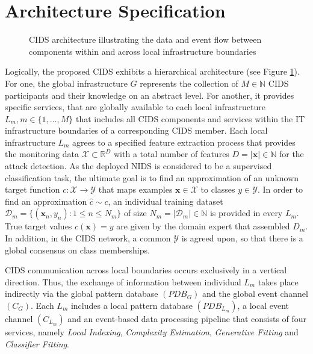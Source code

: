 \documentclass[../../main.tex]{subfiles}
\begin{document}
\section{Architecture Specification} \label{sec:architecture_specification}



\begin{figure}[b!]
    \centering
    
    \caption{CIDS architecture illustrating the data and event flow between components within and across local infrastructure boundaries}
    \label{fig:detailed_architecture}
    \end{figure}

    
    Logically, the proposed CIDS exhibits a hierarchical architecture (see Figure \ref{fig:detailed_architecture}). For one, the global infrastructure $G$ represents the collection of $M \in \mathbb{N}$ CIDS participants and their knowledge on an abstract level. For another, it provides specific services, that are globally available to each local infrastructure $L_m, m \in \{1, \dots, M\}$ that includes all CIDS components and services within the IT infrastructure boundaries of a corresponding CIDS member. Each local infrastructure $L_m$ agrees to a specified feature extraction process that provides the monitoring data $\mathcal{X} \subset \mathbb{R}^D$ with a total number of features $D = |\bm{x}| \in \mathbb{N}$ for the attack detection. As the deployed NIDS is considered to be a supervised classification task, the ultimate goal is to find an approximation of an unknown target function $c: \mathcal{X} \rightarrow \mathcal{Y}$ that maps examples $\bm{x} \in \mathcal{X}$ to classes $y \in \mathcal{Y}$. In order to find an approximation $\hat{c} \sim c$, an individual training dataset $\mathcal{D}_m= \{(\bm{x}_n, y_n): 1 \leq n \leq N_m\}$ of size $N_m = |\mathcal{D}_m| \in \mathbb{N}$ is provided in every $L_m$. True target values $c(\bm{x}) = y$ are given by the domain expert that assembled $D_m$. In addition, in the CIDS network, a common $\mathcal{Y}$ is agreed upon, so that there is a global consensus on class memberships.
    
    CIDS communication across local boundaries occurs exclusively in a vertical direction. Thus, the exchange of information between individual $L_m$ takes place indirectly via the global pattern database $(PDB_G)$ and the global event channel $(C_G)$. Each $L_m$ includes a local pattern database $(PDB_{L_m})$, a local event channel $(C_{L_m})$ and an event-based data processing pipeline that consists of four services, namely \textit{Local Indexing}, \textit{Complexity Estimation}, \textit{Generative Fitting} and \textit{Classifier Fitting}. 
    
\end{document}
